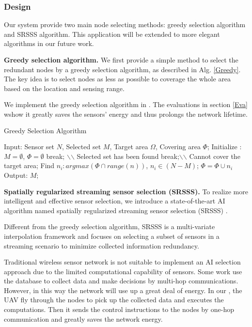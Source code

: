\subsubsection{Design} Our {\sdn} system provide two main node selecting methods: 
greedy selection algorithm and SRSSS algorithm. This application will be extended to more elegant 
algorithms in our future work. 

\textbf{Greedy selection algorithm.} We first provide a simple method to select 
the redundant nodes by a greedy selection algorithm, as described in Alg. \ref{Greedy}. 
The key idea is to select nodes as less as possible to coverage the whole area
 based on the location and sensing range. 
 
We implement the greedy selection algorithm in {\sdn}. The evaluations in section \ref{Eva} 
wshow it greatly saves the sensors' energy and thus prolongs the network lifetime.

\begin{algorithm}
\caption{Greedy Selection Algorithm}
\label{Greedy}
\begin{algorithmic}[1]
\STATE Input: Sensor set $N$, Selected set $M$, Target area $\Omega$, Covering area $\Phi$;
\STATE Initialize : $M = \emptyset$, $\Phi = \emptyset$
    \IF{$\Phi = \Omega $}
        \STATE break; $\backslash$$\backslash$ Selected set has been found
    \ENDIF
    	 \STATE break;$\backslash$$\backslash$ Cannot cover the target area;
    \ENDIF
    \STATE Find $n_i : argmax(\Phi \cap range(n))$, $n_i \in (N-M)$;
    \STATE $\Phi = \Phi \cup {n_i}$
\ENDWHILE
\STATE Output: $M$;
\end{algorithmic}
\end{algorithm}

\textbf{Spatially regularized streaming sensor selection (SRSSS).} 
To realize more intelligent and effective sensor selection, we introduce 
a state-of-the-art AI algorithm named spatially regularized streaming 
sensor selection (SRSSS) \cite{li2016spatially}.

Different from the greedy selection algorithm, SRSSS is a multi-variate 
interpolation framework and focuses on selecting a subset
of sensors in a streaming scenario to minimize collected information redundancy.  

Traditional wireless sensor network is not suitable to implement an AI selection approach
due to the limited computational capability of sensors. Some work use the database to collect data
and make decisions by multi-hop communications. However, in this way the network will use up a great deal of energy.
In our {\sdn}, the UAV fly through the nodes to pick up the collected data and executes the computations.
Then it sends the control instructions to the nodes by one-hop communication and greatly saves the network energy.

